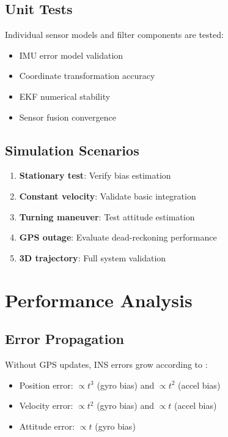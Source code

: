 \documentclass[12pt,a4paper]{article}
\begin{document}
\subsection{Unit Tests}

Individual sensor models and filter components are tested:
\begin{itemize}
    \item IMU error model validation
    \item Coordinate transformation accuracy
    \item EKF numerical stability
    \item Sensor fusion convergence
\end{itemize}

\subsection{Simulation Scenarios}

\begin{enumerate}
    \item \textbf{Stationary test}: Verify bias estimation
    \item \textbf{Constant velocity}: Validate basic integration
    \item \textbf{Turning maneuver}: Test attitude estimation
    \item \textbf{GPS outage}: Evaluate dead-reckoning performance
    \item \textbf{3D trajectory}: Full system validation
\end{enumerate}

\section{Performance Analysis}

\subsection{Error Propagation}

Without GPS updates, INS errors grow according to \cite{woodman2007introduction}:

\begin{itemize}
    \item Position error: $\propto t^3$ (gyro bias) and $\propto t^2$ (accel bias)
    \item Velocity error: $\propto t^2$ (gyro bias) and $\propto t$ (accel bias)
    \item Attitude error: $\propto t$ (gyro bias)
\end{itemize}
\end{document}
